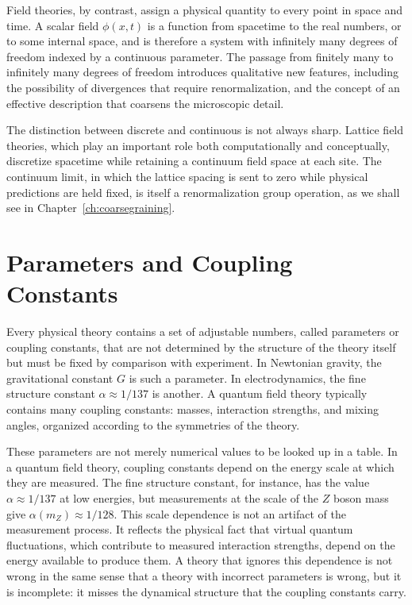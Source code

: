 \documentclass[11pt, twoside, openright]{book}
\theoremstyle{dotted}
\theoremstyle{definition}
\begin{document}
Field theories, by contrast, assign a physical quantity to every point in space
and time. A scalar field $\phi(x,t)$ is a function from spacetime to the real
numbers, or to some internal space, and is therefore a system with infinitely many
degrees of freedom indexed by a continuous parameter. The passage from finitely
many to infinitely many degrees of freedom introduces qualitative new features,
including the possibility of divergences that require renormalization, and the
concept of an effective description that coarsens the microscopic detail.

The distinction between discrete and continuous is not always sharp. Lattice
field theories, which play an important role both computationally and conceptually,
discretize spacetime while retaining a continuum field space at each site. The
continuum limit, in which the lattice spacing is sent to zero while physical
predictions are held fixed, is itself a renormalization group operation, as we
shall see in Chapter~\ref{ch:coarsegraining}.

\section{Parameters and Coupling Constants}

Every physical theory contains a set of adjustable numbers, called parameters or
coupling constants, that are not determined by the structure of the theory itself
but must be fixed by comparison with experiment. In Newtonian gravity, the
gravitational constant $G$ is such a parameter. In electrodynamics, the fine
structure constant $\alpha \approx 1/137$ is another. A quantum field theory
typically contains many coupling constants: masses, interaction strengths,
and mixing angles, organized according to the symmetries of the theory.

These parameters are not merely numerical values to be looked up in a table. In
a quantum field theory, coupling constants depend on the energy scale at which
they are measured. The fine structure constant, for instance, has the value
$\alpha \approx 1/137$ at low energies, but measurements at the scale of the
$Z$ boson mass give $\alpha(m_Z) \approx 1/128$. This scale dependence is not an
artifact of the measurement process. It reflects the physical fact that virtual
quantum fluctuations, which contribute to measured interaction strengths, depend on
the energy available to produce them. A theory that ignores this dependence is not
wrong in the same sense that a theory with incorrect parameters is wrong, but it is
incomplete: it misses the dynamical structure that the coupling constants carry.
\end{document}
